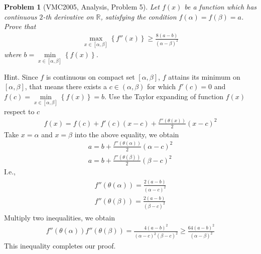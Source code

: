 \documentclass{article}
\newtheorem{problem}{Problem}
\begin{document}
\begin{problem}[VMC2005, Analysis, Problem 5]
	Let $f(x)$ be a function which has continuous $2$-th derivative on $\mathbb{R}$, satisfying the condition $f\left( \alpha  \right) = f\left( \beta  \right) = a$. Prove that
	\begin{align}
		\mathop {\max }\limits_{x \in \left[ {\alpha ,\beta } \right]} \left\{ {f''\left( x \right)} \right\} \ge \frac{{8\left( {a - b} \right)}}{{{{\left( {\alpha  - \beta } \right)}^2}}}
	\end{align}
	where $b = \mathop {\min }\limits_{x \in \left[ {\alpha ,\beta } \right]} \left\{ {f\left( x \right)} \right\}$.
\end{problem}
{\sf Hint.} Since $f$ is continuous on compact set $\left[ {\alpha ,\beta } \right]$, $f$ attains its minimum on $\left[ {\alpha ,\beta } \right]$, that means there exists a $c \in (\alpha,\beta)$ for which $f'(c)=0$ and $f(c) = \mathop {\min }\limits_{x \in \left[ {\alpha ,\beta } \right]} \left\{ {f\left( x \right)} \right\}=b$. Use the Taylor expanding of function $f(x) $ respect to $c$
\begin{align}
	f\left( x \right) = f\left( c \right) + f'\left( c \right)\left( {x - c} \right) + \frac{{f''\left( {\theta \left( x \right)} \right)}}{2}{\left( {x - c} \right)^2}
\end{align}
Take $x=\alpha$ and $x=\beta$ into the above equality, we obtain
\begin{align}
	a = b + \frac{{f''\left( {\theta \left( \alpha  \right)} \right)}}{2}{\left( {\alpha  - c} \right)^2}\\
	a = b + \frac{{f''\left( {\theta \left( \beta  \right)} \right)}}{2}{\left( {\beta  - c} \right)^2}
\end{align}
I.e.,
\begin{align}
	\begin{array}{l}
		f''\left( {\theta \left( \alpha  \right)} \right) = \frac{{2\left( {a - b} \right)}}{{{{\left( {\alpha  - c} \right)}^2}}}\\
		f''\left( {\theta \left( \beta  \right)} \right) = \frac{{2\left( {a - b} \right)}}{{{{\left( {\beta  - c} \right)}^2}}}
	\end{array}
\end{align}
Multiply two inequalities, we obtain
\begin{align}
	f''\left( {\theta \left( \alpha  \right)} \right)f''\left( {\theta \left( \beta  \right)} \right) = \frac{{4{{\left( {a - b} \right)}^2}}}{{{{\left( {\alpha  - c} \right)}^2}{{\left( {\beta  - c} \right)}^2}}} \ge \frac{{64{{\left( {a - b} \right)}^2}}}{{{{\left( {\alpha  - \beta } \right)}^2}}}
\end{align}
This inequality completes our proof.
\end{document}
